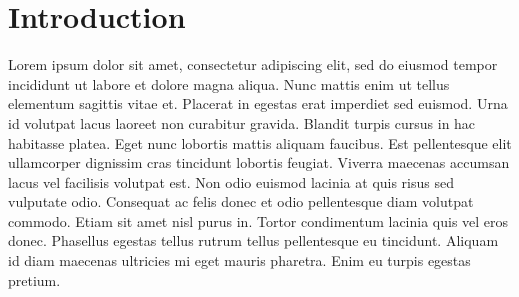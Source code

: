 \chapter*{Introduction} 

Lorem ipsum dolor sit amet, consectetur adipiscing elit, sed do eiusmod tempor incididunt ut labore et dolore magna aliqua. Nunc 
mattis enim ut tellus elementum sagittis vitae et. Placerat in egestas erat imperdiet sed euismod. Urna id volutpat lacus laoreet 
non curabitur gravida. Blandit turpis cursus in hac habitasse platea. Eget nunc lobortis mattis aliquam faucibus. Est pellentesque 
elit ullamcorper dignissim cras tincidunt lobortis feugiat. Viverra maecenas accumsan lacus vel facilisis volutpat est. Non odio 
euismod lacinia at quis risus sed vulputate odio. Consequat ac felis donec et odio pellentesque diam volutpat commodo. Etiam sit 
amet nisl purus in. Tortor condimentum lacinia quis vel eros donec. Phasellus egestas tellus rutrum tellus pellentesque eu tincidunt. 
Aliquam id diam maecenas ultricies mi eget mauris pharetra. Enim eu turpis egestas pretium.